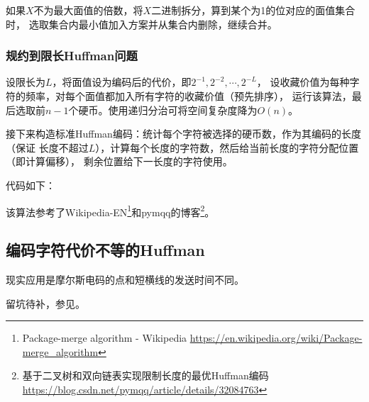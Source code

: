 如果$X$不为最大面值的倍数，将$X$二进制拆分，算到某个为1的位对应的面值集合时，
选取集合内最小值加入方案并从集合内删除，继续合并。
\subsubsection{规约到限长Huffman问题}
设限长为$L$，将面值设为编码后的代价，即$2^{-1},2^{-2},\cdots,2^{-L}$，
设收藏价值为每种字符的频率，对每个面值都加入所有字符的收藏价值（预先排序），
运行该算法，最后选取前$n-1$个硬币。使用递归分治可将空间复杂度降为$O(n)$。

接下来构造标准Huffman编码：统计每个字符被选择的硬币数，作为其编码的长度（保证
长度不超过$L$），计算每个长度的字符数，然后给当前长度的字符分配位置（即计算偏移），
剩余位置给下一长度的字符使用。

代码如下：


该算法参考了Wikipedia-EN\footnote{
	Package-merge algorithm - Wikipedia
	\url{https://en.wikipedia.org/wiki/Package-merge\_algorithm}
}和pymqq的博客\footnote{
	基于二叉树和双向链表实现限制长度的最优Huffman编码
	\url{https://blog.csdn.net/pymqq/article/details/32084763}
}。
\subsection{编码字符代价不等的Huffman}
现实应用是摩尔斯电码的点和短横线的发送时间不同。

留坑待补，参见\cite{huffman}。

